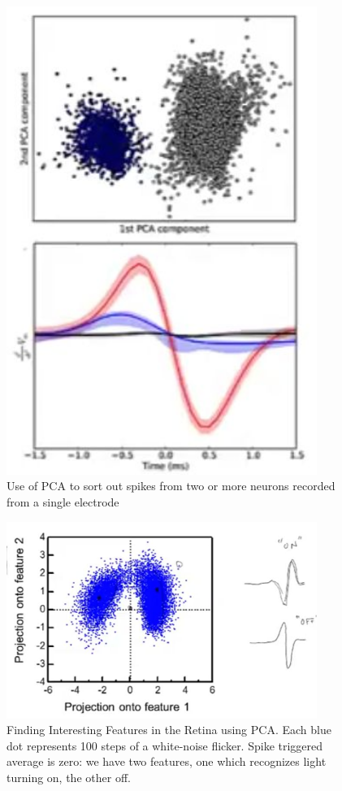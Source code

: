 \documentclass[]{article}
\begin{document}
\begin{figure}[H]
	\caption[Use of PCA to sort out spikes]{Use of PCA to sort out spikes from two or more neurons recorded from a single electrode}
	\includegraphics[width=0.9\textwidth]{pca-spike-sorting}
\end{figure}

\begin{figure}[H]
	\caption[Finding Interesting Features in the Retina using PCA]{Finding Interesting Features in the Retina using PCA. Each blue dot represents 100 steps of a white-noise flicker. Spike triggered average is zero: we have two features, one which recognizes light turning on, the other off.}
	\includegraphics[width=0.9\textwidth]{finding-interestimg-features}
\end{figure}
\end{document}
